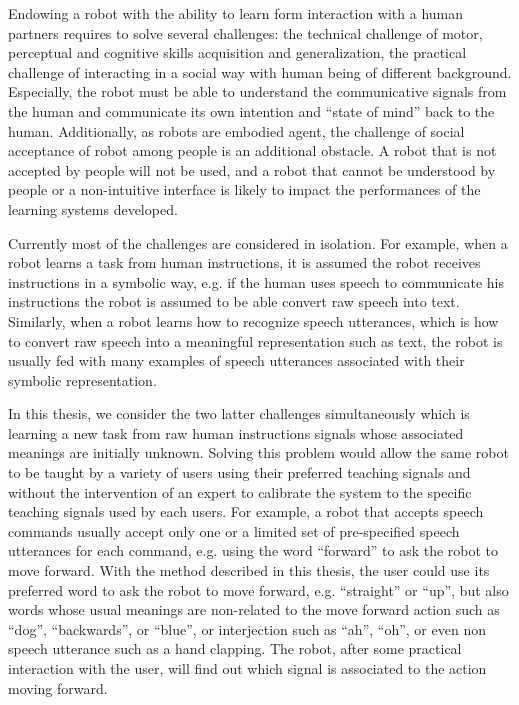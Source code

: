 Endowing a robot with the ability to learn form interaction with a human partners requires to solve several challenges: the technical challenge of motor, perceptual and cognitive skills acquisition and generalization, the practical challenge of interacting in a social way with human being of different background. Especially, the robot must be able to understand the communicative signals from the human and communicate its own intention and ``state of mind'' back to the human. Additionally, as robots are embodied agent, the challenge of social acceptance of robot among people is an additional obstacle. A robot that is not accepted by people will not be used, and a robot that cannot be understood by people or a non-intuitive interface is likely to impact the performances of the learning systems developed.

Currently most of the challenges are considered in isolation. For example, when a robot learns a task from human instructions, it is assumed the robot receives instructions in a symbolic way, e.g. if the human uses speech to communicate his instructions the robot is assumed to be able convert raw speech into text. Similarly, when a robot learns how to recognize speech utterances, which is how to convert raw speech into a meaningful representation such as text, the robot is usually fed with many examples of speech utterances associated  with their symbolic representation.

In this thesis, we consider the two latter challenges simultaneously which is learning a new task from raw human instructions signals whose associated meanings are initially unknown. Solving this problem would allow the same robot to be taught by a variety of users using their preferred teaching signals and without the intervention of an expert to calibrate the system to the specific teaching signals used by each users. For example, a robot that accepts speech commands usually accept only one or a limited set of pre-specified speech utterances for each command, e.g. using the word ``forward'' to ask the robot to move forward. With the method described in this thesis, the user could use its preferred word to ask the robot to move forward, e.g. ``straight'' or ``up'', but also words whose usual meanings are non-related to the move forward action such as ``dog'', ``backwards'', or ``blue'', or interjection such as ``ah'', ``oh'', or even non speech utterance such as a hand clapping. The robot, after some practical interaction with the user, will find out which signal is associated to the action moving forward.

